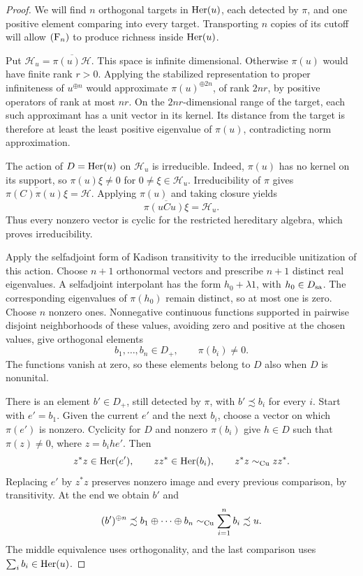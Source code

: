 \begin{proof}
We will find \(n\) orthogonal targets in \(\operatorname{Her}(u)\), each detected
by \(\pi\), and one positive element comparing into every target.
Transporting \(n\) copies of its cutoff will allow \(\textup{(F\ensuremath{_n})}\) to
produce richness inside \(\operatorname{Her}(u)\).

Put \(\mathcal H_u=\overline{\pi(u)\mathcal H}\).  This space is
infinite dimensional.  Otherwise \(\pi(u)\) would have finite rank
\(r>0\).  Applying the stabilized representation to proper
infiniteness of \(u^{\oplus n}\) would approximate
\(\pi(u)^{\oplus2n}\), of rank \(2nr\), by positive operators of
rank at most \(nr\).  On the \(2nr\)-dimensional range of the target,
each such approximant has a unit vector in its kernel.  Its distance
from the target is therefore at least the least positive eigenvalue
of \(\pi(u)\), contradicting norm approximation.

The action of \(D=\operatorname{Her}(u)\) on \(\mathcal H_u\) is irreducible.
Indeed, \(\pi(u)\) has no kernel on its support, so
\(\pi(u)\xi\ne0\) for \(0\ne\xi\in\mathcal H_u\).
Irreducibility of \(\pi\) gives
\(\overline{\pi(C)\pi(u)\xi}=\mathcal H\).  Applying \(\pi(u)\)
and taking closure yields
\[
 \overline{\pi(uCu)\xi}=\mathcal H_u.
\]
Thus every nonzero vector is cyclic for the restricted hereditary
algebra, which proves irreducibility.

Apply the selfadjoint form of Kadison transitivity
\cite[Theorem~1]{Kadison1957} to the irreducible unitization of this
action.  Choose \(n+1\) orthonormal vectors and prescribe \(n+1\)
distinct real eigenvalues.  A selfadjoint interpolant has the form
\(h_0+\lambda1\), with \(h_0\in D_{\rm sa}\).  The corresponding
eigenvalues of \(\pi(h_0)\) remain distinct, so at most one is zero.
Choose \(n\) nonzero ones.  Nonnegative continuous functions
supported in pairwise disjoint neighborhoods of these values,
avoiding zero and positive at the chosen values, give orthogonal
elements
\[
 b_1,\ldots,b_n\in D_+,\qquad \pi(b_i)\ne0.
\]
The functions vanish at zero, so these elements belong to \(D\)
also when \(D\) is nonunital.

There is an element \(b'\in D_+\), still detected by \(\pi\), with
\(b'\precsim b_i\) for every \(i\).  Start with \(e'=b_1\).
Given the current \(e'\) and the next \(b_i\), choose a vector on
which \(\pi(e')\) is nonzero.  Cyclicity for \(D\) and nonzero
\(\pi(b_i)\) give \(h\in D\) such that \(\pi(z)\ne0\), where
\(z=b_ihe'\).  Then
\[
 z^*z\in\operatorname{Her}(e'),\qquad zz^*\in\operatorname{Her}(b_i),\qquad
 z^*z\sim_{\mathrm{Cu}} zz^*.
\]
Replacing \(e'\) by \(z^*z\) preserves nonzero image and every
previous comparison, by transitivity.  At the end we obtain \(b'\)
and
\begin{equation}\label{eq:local-rich-comparison}
 (b')^{\oplus n}\precsim b_1\oplus\cdots\oplus b_n
 \sim_{\mathrm{Cu}}\sum_{i=1}^{n}b_i\precsim u.
\end{equation}
The middle equivalence uses orthogonality, and the last comparison
uses \(\sum_i b_i\in\operatorname{Her}(u)\).


\end{proof}
